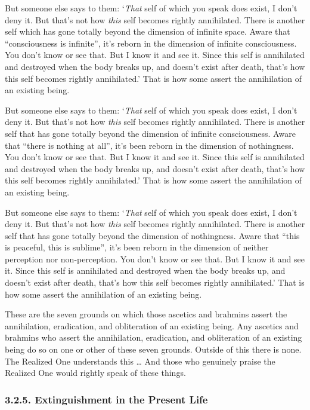 \documentclass[12pt,openany]{book}%
\begin{document}
But someone else says to them: ‘\emph{That} self of which you speak does exist, I don’t deny it. But that’s not how \emph{this} self becomes rightly annihilated. There is another self which has gone totally beyond the dimension of infinite space. Aware that “consciousness is infinite”, it’s reborn in the dimension of infinite consciousness. You don’t know or see that. But I know it and see it. Since this self is annihilated and destroyed when the body breaks up, and doesn’t exist after death, that’s how this self becomes rightly annihilated.’ That is how some assert the annihilation of an existing being. 

But someone else says to them: ‘\emph{That} self of which you speak does exist, I don’t deny it. But that’s not how \emph{this} self becomes rightly annihilated. There is another self that has gone totally beyond the dimension of infinite consciousness. Aware that “there is nothing at all”, it’s been reborn in the dimension of nothingness. You don’t know or see that. But I know it and see it. Since this self is annihilated and destroyed when the body breaks up, and doesn’t exist after death, that’s how this self becomes rightly annihilated.’ That is how some assert the annihilation of an existing being. 

But someone else says to them: ‘\emph{That} self of which you speak does exist, I don’t deny it. But that’s not how \emph{this} self becomes rightly annihilated. There is another self that has gone totally beyond the dimension of nothingness. Aware that “this is peaceful, this is sublime”, it’s been reborn in the dimension of neither perception nor non-perception. You don’t know or see that. But I know it and see it. Since this self is annihilated and destroyed when the body breaks up, and doesn’t exist after death, that’s how this self becomes rightly annihilated.’ That is how some assert the annihilation of an existing being. 

These are the seven grounds on which those ascetics and brahmins assert the annihilation, eradication, and obliteration of an existing being. Any ascetics and brahmins who assert the annihilation, eradication, and obliteration of an existing being do so on one or other of these seven grounds. Outside of this there is none. The Realized One understands this … And those who genuinely praise the Realized One would rightly speak of these things. 

\subsubsection*{3.2.5. Extinguishment in the Present Life }
\end{document}
